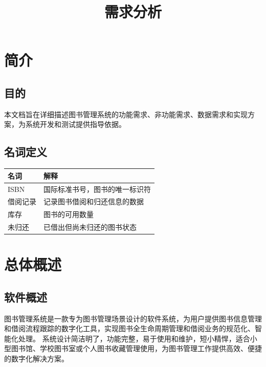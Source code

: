\documentclass[UTF-8]{ctexart}
\begin{document}
\title{需求分析}
\author{}
\date{}
\maketitle
\newpage

\tableofcontents
\newpage

\section{简介}
\subsection{目的}
本文档旨在详细描述图书管理系统的功能需求、非功能需求、数据需求和实现方案，为系统开发和测试提供指导依据。

\subsection{名词定义}

\begin{longtable}{ll}
\toprule
名词 & 解释 \\
\midrule
ISBN & 国际标准书号，图书的唯一标识符 \\
借阅记录 & 记录图书借阅和归还信息的数据 \\
库存 & 图书的可用数量 \\
未归还 & 已借出但尚未归还的图书状态 \\
\bottomrule
\end{longtable}

\section{总体概述}
\subsection{软件概述}
图书管理系统是一款专为图书管理场景设计的软件系统，为用户提供图书信息管理和借阅流程跟踪的数字化工具，实现图书全生命周期管理和借阅业务的规范化、智能化处理。
系统设计简洁明了，功能完整，易于使用和维护，短小精悍，适合小型图书馆、学校图书室或个人图书收藏管理使用，为图书管理工作提供高效、便捷的数字化解决方案。
\end{document}
